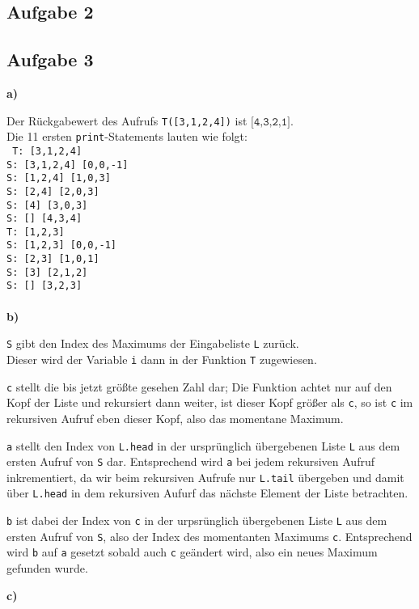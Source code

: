 \documentclass[a4paper,graphics,11pt]{article}
\newcommand{\aufgabe}[1]{\subsection*{Aufgabe #1}}
\begin{document}
\newpage
\aufgabe{2}
\newpage
\aufgabe{3}
\textbf{a)}

Der Rückgabewert des Aufrufs \texttt{T([3,1,2,4])} ist $\texttt{[4,3,2,1]}$.\\
Die 11 ersten \texttt{print}-Statements lauten wie folgt:\\
\texttt{
    T: [3,1,2,4] \\
    S: [3,1,2,4] [0,0,-1]\\
    S: [1,2,4] [1,0,3]\\
    S: [2,4] [2,0,3]\\
    S: [4] [3,0,3]\\
    S: [] [4,3,4]\\
    T: [1,2,3]\\
    S: [1,2,3] [0,0,-1]\\
    S: [2,3] [1,0,1]\\
    S: [3] [2,1,2]\\
    S: [] [3,2,3]\\
}\\
\textbf{b)}

\texttt{S} gibt den Index des Maximums der Eingabeliste \texttt{L} zurück.\\
Dieser wird der Variable \texttt{i} dann in der Funktion \texttt{T} zugewiesen.

\texttt{c} stellt die bis jetzt größte gesehen Zahl dar; Die Funktion achtet nur auf den
Kopf der Liste und rekursiert dann weiter, ist dieser Kopf größer als \texttt{c}, so ist
\texttt{c} im rekursiven Aufruf eben dieser Kopf, also das momentane Maximum.

\texttt{a} stellt den Index von \texttt{L.head} in der ursprünglich übergebenen Liste \texttt{L} aus dem
ersten Aufruf von \texttt{S} dar. Entsprechend wird \texttt{a} bei jedem rekursiven Aufruf inkrementiert,
da wir beim rekursiven Aufrufe nur \texttt{L.tail} übergeben und damit über \texttt{L.head} in dem
rekursiven Aufurf das nächste Element der Liste betrachten.

\texttt{b} ist dabei der Index von \texttt{c} in der urpsrünglich übergebenen Liste \texttt{L} aus dem
ersten Aufruf von \texttt{S}, also der Index des momentanten Maximums \texttt{c}.
Entsprechend wird \texttt{b} auf \texttt{a} gesetzt sobald auch
\texttt{c} geändert wird, also ein neues Maximum gefunden wurde.

\textbf{c)}
\end{document}
